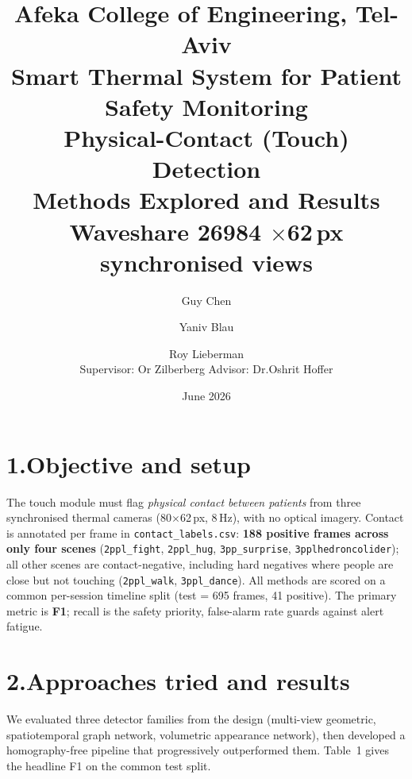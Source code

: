\documentclass[11pt, a4paper]{article}
\title{%
    {\large Afeka College of Engineering, Tel-Aviv}\\[0.3em]
    {\large Smart Thermal System for Patient Safety Monitoring}\\[0.7em]
    {\LARGE\bfseries Physical-Contact (Touch) Detection}\\[0.2em]
    {\large Methods Explored and Results}\\[0.3em]
    {\normalsize Waveshare 26984 \quad 80$\times$62\,px \quad 3 synchronised views}
}
\author{Guy Chen \and Yaniv Blau \and Roy Lieberman\\[0.2em]
    \small Supervisor: Or Zilberberg \qquad Advisor: Dr.\@ Oshrit Hoffer}
\date{June 2026}
\begin{document}
\maketitle

\section*{1.\quad Objective and setup}
The touch module must flag \emph{physical contact between patients} from three
synchronised thermal cameras (80$\times$62\,px, 8\,Hz), with no optical imagery.
Contact is annotated per frame in \texttt{contact\_labels.csv}:
\textbf{188 positive frames across only four scenes} (\texttt{2ppl\_fight},
\texttt{2ppl\_hug}, \texttt{3pp\_surprise}, \texttt{3pplhedroncolider}); all
other scenes are contact-negative, including hard negatives where people are
close but not touching (\texttt{2ppl\_walk}, \texttt{3ppl\_dance}). All methods
are scored on a common per-session timeline split (test = 695 frames, 41
positive). The primary metric is \textbf{F1}; recall is the safety priority,
false-alarm rate guards against alert fatigue.

\section*{2.\quad Approaches tried and results}

We evaluated three detector families from the design (multi-view geometric,
spatiotemporal graph network, volumetric appearance network), then developed a
homography-free pipeline that progressively outperformed them. Table~1 gives the
headline F1 on the common test split.
\end{document}
